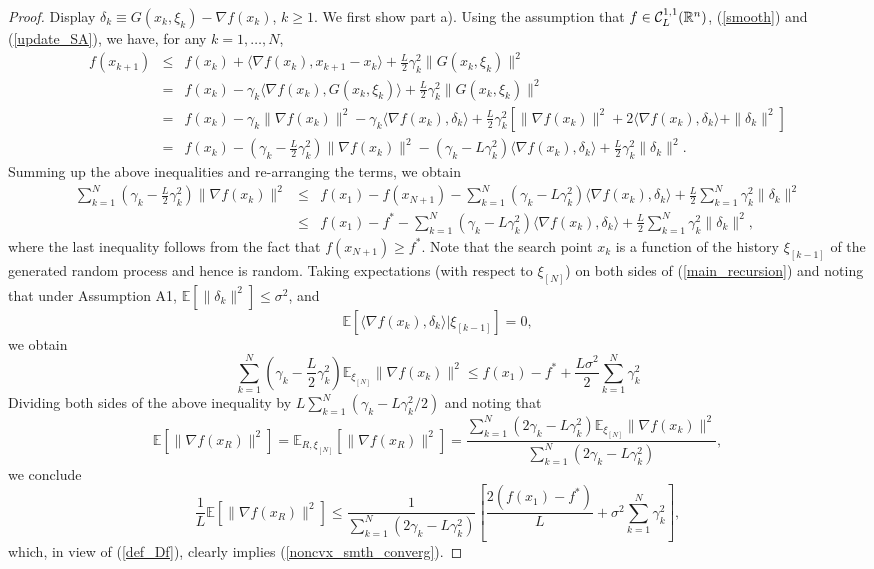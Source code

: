 \documentclass[final]{siamltex}
\newcommand{\beq}{\begin{equation}}
\newcommand{\eeq}{\end{equation}}
\newcommand{\beqa}{\begin{eqnarray}}
\newcommand{\eeqa}{\end{eqnarray}}
\newcommand{\nn}{\nonumber}
\def\eqnok#1{(\ref{#1})}
\def\vgap{\vspace*{.1in}}
\newcommand{\bbe}{\mathbb{E}}
\newcommand{\bbr}{\mathbb{R}}
\begin{document}
\vgap
\begin{proof}
Display $\delta_k \equiv G(x_k, \xi_k) - \nabla f(x_k)$, $k \ge 1$.
We first show part a). Using the assumption that $f \in {\cal C}_L^{1,1}(\bbr^n)$, \eqnok{smooth} and
\eqnok{update_SA}, we have, for any $k = 1, \ldots, N$,
\beqa
f(x_{k+1}) &\le& f(x_k) + \langle \nabla f(x_k), x_{k+1}-x_k \rangle + \frac{L}{2} \gamma_k^2 \|G(x_k, \xi_k)\|^2 \nn \\
&=& f(x_k) -\gamma_k \langle \nabla f(x_k), G(x_k, \xi_k) \rangle + \frac{L}{2} \gamma_k^2 \|G(x_k, \xi_k)\|^2 \nn \\
&=& f(x_k) -\gamma_k \|\nabla f(x_k)\|^2 - \gamma_k \langle \nabla f(x_k), \delta_k \rangle + \frac{L}{2} \gamma_k^2
\left[\|\nabla f(x_k)\|^2 + 2 \langle \nabla f(x_k), \delta_k \rangle + \|\delta_k\|^2  \right] \nn \\
&=& f(x_k) - \left(\gamma_k - \frac{L}{2} \gamma_k^2\right) \|\nabla f(x_k)\|^2
- \left(\gamma_k - L \gamma_k^2 \right) \langle \nabla f(x_k), \delta_k \rangle + \frac{L}{2} \gamma_k^2 \|\delta_k\|^2. \label{noncvx_smth_cnvg1}
\eeqa
Summing up the above inequalities and re-arranging the terms, we obtain
\beqa
\sum_{k=1}^N \left(\gamma_k - \frac{L}{2} \gamma_k^2\right) \|\nabla f(x_k)\|^2
&\le& f(x_1) - f(x_{N+1}) - \sum_{k=1}^N \left(\gamma_k - L \gamma_k^2 \right) \langle \nabla f(x_k), \delta_k \rangle +
\frac{L}{2} \sum_{k=1}^N  \gamma_k^2 \|\delta_k\|^2 \nn \\
&\le& f(x_1) - f^* - \sum_{k=1}^N \left(\gamma_k - L \gamma_k^2 \right) \langle \nabla f(x_k), \delta_k \rangle +
\frac{L}{2} \sum_{k=1}^N  \gamma_k^2 \|\delta_k\|^2,\label{main_recursion}
\eeqa
where the last inequality follows from the fact that $f(x_{N+1}) \ge f^*$.
Note that the search point $x_k$ is a function of
the history $\xi_{[k-1]}$ of the
generated random process and hence is random.
Taking expectations (with respect to $\xi_{[N]}$)
on both sides of \eqnok{main_recursion}
and noting that under Assumption A1, $\bbe[\|\delta_k\|^2]
\le \sigma^2$,
 and
\beq \label{fh_seq0}
\bbe[\langle \nabla f(x_k), \delta_k \rangle |\xi_{[k-1]}] = 0,
\eeq
we obtain
\beq \label{main_recursion2}
\sum_{k=1}^N \left(\gamma_k - \frac{L}{2} \gamma_k^2\right) \bbe_{\xi_{[N]}}\|\nabla f(x_k)\|^2
\le f(x_1) - f^* +
\frac{L\sigma^2}{2} \sum_{k=1}^N  \gamma_k^2
\eeq
Dividing both sides of the above inequality by
$L \sum_{k=1}^N \left(\gamma_k - L \gamma_k^2 / 2\right)$ and
noting that
\[
\bbe[\|\nabla f(x_R)\|^2] = \bbe_{R, \xi_{[N]}}[\|\nabla f(x_R)\|^2] =
\frac{\sum_{k=1}^N \left(2\gamma_k - L \gamma_k^2\right) \bbe_{\xi_{[N]}}\|\nabla f(x_k)\|^2}
{\sum_{k=1}^N \left(2\gamma_k - L \gamma_k^2\right)},
\]
we conclude
\[
\frac{1}{L} \bbe[\|\nabla f(x_R)\|^2] \le \frac{1}{{\sum_{k=1}^N (2\gamma_k-L\gamma_k^2)}} \left[
\frac{2\left(f(x_1) - f^*\right)}{L} + \sigma^2 {\sum_{k=1}^N \gamma_k^2}\right],
\]
which, in view of \eqnok{def_Df}, clearly implies \eqnok{noncvx_smth_converg}.


\end{proof}
\end{document}
